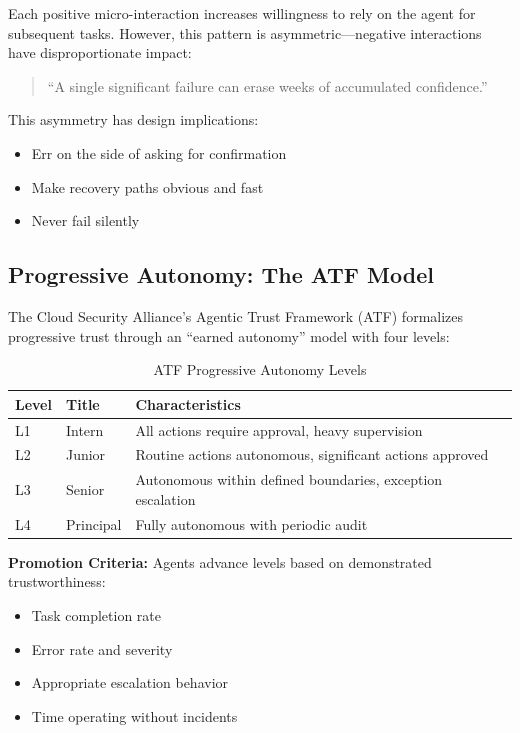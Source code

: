 Each positive micro-interaction increases willingness to rely on the agent for subsequent tasks. However, this pattern is asymmetric---negative interactions have disproportionate impact:

\begin{quote}
``A single significant failure can erase weeks of accumulated confidence.''
\end{quote}

This asymmetry has design implications:
\begin{itemize}
    \item Err on the side of asking for confirmation
    \item Make recovery paths obvious and fast
    \item Never fail silently
\end{itemize}

\subsection{Progressive Autonomy: The ATF Model}
\label{subsec:atf-model}

The Cloud Security Alliance's Agentic Trust Framework (ATF) formalizes progressive trust through an ``earned autonomy'' model with four levels:

\begin{table}[htbp]
\centering
\caption{ATF Progressive Autonomy Levels}
\label{tab:atf-levels}
\begin{tabular}{lll}
\toprule
\textbf{Level} & \textbf{Title} & \textbf{Characteristics} \\
\midrule
L1 & Intern & All actions require approval, heavy supervision \\
L2 & Junior & Routine actions autonomous, significant actions approved \\
L3 & Senior & Autonomous within defined boundaries, exception escalation \\
L4 & Principal & Fully autonomous with periodic audit \\
\bottomrule
\end{tabular}
\end{table}

\textbf{Promotion Criteria:}
Agents advance levels based on demonstrated trustworthiness:
\begin{itemize}
    \item Task completion rate
    \item Error rate and severity
    \item Appropriate escalation behavior
    \item Time operating without incidents
\end{itemize}

